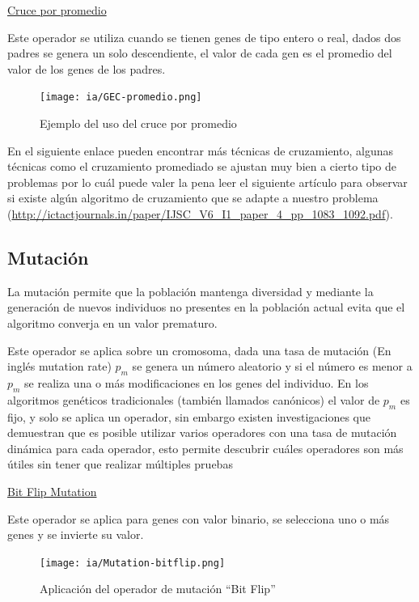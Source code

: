\documentclass[11pt,fleqn]{book} %
\begin{document}
\underline{Cruce por promedio}

Este operador se utiliza cuando se tienen genes de tipo entero o real, dados dos padres se genera un solo descendiente, el valor de cada gen es el promedio del valor de los genes de los padres.

\begin{figure}[ht]
\centering\texttt{[image: ia/GEC-promedio.png]}
\caption{Ejemplo del uso del cruce por promedio}
\label{fig:GEC-promedio} 
\end{figure}

En el siguiente enlace pueden encontrar más técnicas de cruzamiento, algunas técnicas como el cruzamiento promediado se ajustan muy bien a cierto tipo de problemas por lo cuál puede valer la pena leer el siguiente artículo para observar si existe algún algoritmo de cruzamiento que se adapte a nuestro problema
(\url{http://ictactjournals.in/paper/IJSC_V6_I1_paper_4_pp_1083_1092.pdf}).

\subsection{Mutación} 

La mutación permite que la población mantenga diversidad y mediante la generación de nuevos individuos no presentes en la población actual evita que el algoritmo converja en un valor prematuro.

Este operador se aplica sobre un cromosoma, dada una tasa de mutación (En inglés mutation rate) $p_{m}$ se genera un número aleatorio y si el número es menor a $p_{m}$ se realiza una o más modificaciones en los genes del individuo. En los algoritmos genéticos tradicionales (también llamados canónicos) el valor de $p_{m}$ es fijo, y solo se aplica un operador, sin embargo existen investigaciones que demuestran que es posible utilizar varios operadores con una tasa de mutación dinámica para cada operador, esto permite descubrir cuáles operadores son más útiles sin tener que realizar múltiples pruebas \cite{DYNAMIC_MUTATION}

\clearpage

\underline{Bit Flip Mutation}

Este operador se aplica para genes con valor binario, se selecciona uno o más genes y se invierte su valor.

\begin{figure}[ht]
\centering\texttt{[image: ia/Mutation-bitflip.png]}
\caption{Aplicación del operador de mutación “Bit Flip”}
\label{fig:Mutation-bitflip} 
\end{figure}
\end{document}
